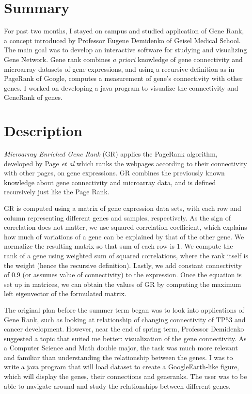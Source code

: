 \documentclass[]{article}
\begin{document}
\tableofcontents

\bigskip \bigskip \bigskip \bigskip

\section{Summary}

For past two months, I stayed on campus and studied application of Gene Rank, a concept introduced by Professor Eugene Demidenko of Geisel Medical School. The main goal was to develop an interactive software for studying and visualizing Gene Network. Gene rank combines \textit{a priori} knowledge of gene connectivity and microarray datasets of gene expressions, and using a recursive definition as in PageRank of Google, computes a measurement of gene's connectivity with other genes. I worked on developing a java program to visualize the connectivity and GeneRank of genes.  

\pagebreak

\section{Description}

 \textit{Microarray Enriched Gene Rank} (GR) applies the PageRank algorithm, developed by Page \textit{et al} \cite{pagerank} which ranks the webpages according to their connectivity with other pages, on gene expressions. GR combines the previously known knowledge about gene connectivity and microarray data, and is defined recursively just like the Page Rank.
 
 GR is computed using a matrix of gene expression data sets, with each row and column representing different genes and samples, respectively. As the sign of correlation does not matter, we use squared correlation coefficient, which explains how much of variations of a gene can be explained by that of the other gene. We normalize the resulting matrix so that sum of each row is 1. We compute the rank of a gene using weighted sum of squared correlations, where the rank itself is the weight (hence the recursive definition). Lastly, we add constant connectivity of 0.9 (or assumes  value of connectivity) to the expression. Once the equation is set up in matrices, we can obtain the values of GR by computing the maximum left eigenvector of the formulated matrix. \cite{generankdef}

The original plan before the summer term began was to look into applications of Gene Rank, such as looking at relationship of changing connectivity of TP53 and cancer development. However, near the end of spring term, Professor Demidenko suggested a topic that suited me better: visualization of the gene connectivity. As a Computer Science and Math double major, the task was much more relevant and familiar than understanding the relationship between the genes. I was to write a java program that will load dataset to create a GoogleEarth-like figure, which will display the genes, their connections and generanks. The user was to be able to navigate around and study the relationships between different genes. 
\end{document}
